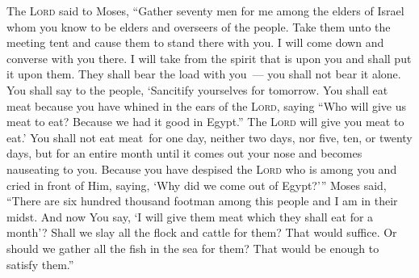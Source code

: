 \begin{inparaenum}
   The \textsc{Lord} said to Moses, ``Gather seventy men for me among the elders of Israel whom you know to be elders and overseers of the people. Take them unto the meeting tent and cause them to stand there with you.%
   I will come down and converse with you there. I will take from the spirit that is upon you and shall put it upon them. They shall bear the load with you~--- you shall not bear it alone.%
   You shall say to the people, `Sancitify yourselves for tomorrow. You shall eat meat because you have whined in the ears of the \textsc{Lord}, saying ``Who will give us meat to eat? Because we had it good in Egypt.'' The \textsc{Lord} will give you meat to eat.'%
   You shall not eat meat\understood\ for one day, neither two days, nor five, ten, or twenty days,%
   but for an entire month until it comes out your nose and becomes nauseating to you. Because you have despised the \textsc{Lord} who is among you and cried in front of Him, saying, `Why did we come out of Egypt?'\thinspace''%
   Moses said, ``There are six hundred thousand footman among this people and I am in their midst. And now You say, `I will give them meat which they shall eat for a month'?%
   Shall we slay all the flock and cattle for them? That would suffice. Or should we gather all the fish in the sea for them? That would be enough to satisfy them.''%
  

\end{inparaenum}
